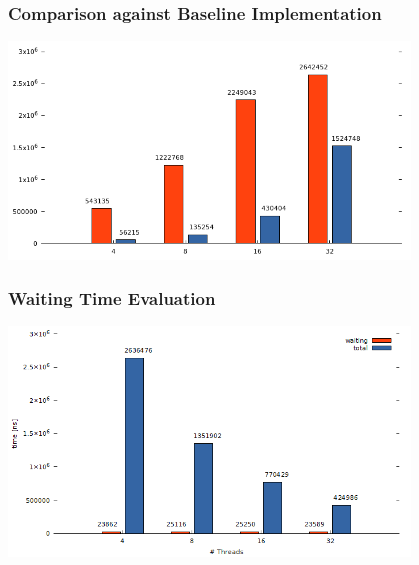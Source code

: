 \documentclass{beamer}
\begin{document}
\begin{frame}
	\frametitle{Comparison against Baseline Implementation}
	\begin{center}
		\includegraphics[width=0.8\textwidth]{img/pool_baseline.png}
	\end{center}
	
\end{frame}

\begin{frame}
	\frametitle{Waiting Time Evaluation}
	\begin{center}
		\includegraphics[width=0.8\textwidth]{img/pool_avg.png}
	\end{center}

\end{frame}
\end{document}
